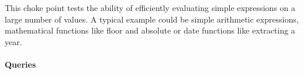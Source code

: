 
This choke point tests the ability of efficiently evaluating simple expressions
on a large number of values. A typical example could be simple arithmetic
expressions, mathematical functions like floor and absolute or date functions
like extracting a year.


\paragraph{Queries}
{\raggedright

}